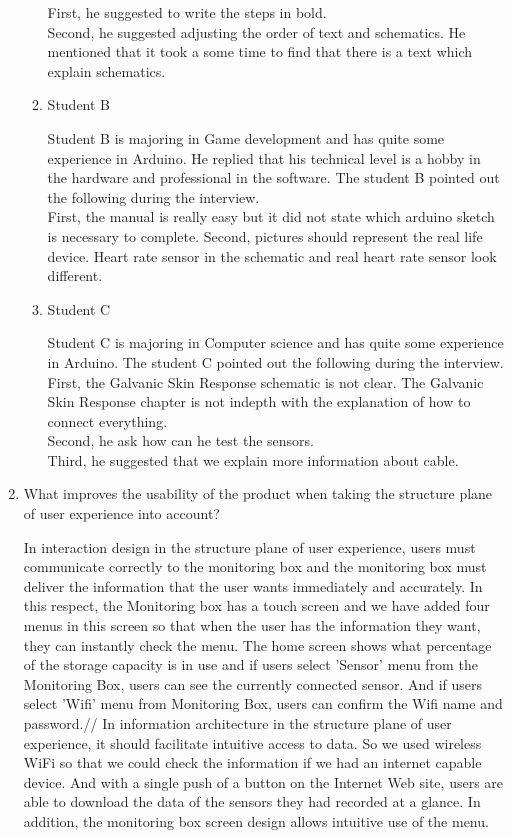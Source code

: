 \documentclass[conference]{IEEEtran}
\begin{document}
\begin{enumerate}
\begin{enumerate}
		First, he suggested to write the steps in bold.\\
		Second, he suggested adjusting the order of text and schematics. He mentioned that it took a some time to find that there is a text which explain schematics. 

\item Student B

Student B is majoring in Game development and has  quite some experience in Arduino. He replied that his technical level is a hobby in the hardware and professional in the software. The student B pointed out the following during the interview.\\

		First, the manual is really easy but it did not state which arduino sketch is necessary to complete.
		Second, pictures should represent the real life device. Heart rate sensor in the schematic and real heart rate sensor look different.

\item Student C

Student C is majoring in Computer science and has  quite some experience in Arduino. The student C pointed out the following during the interview.\\

		First, the Galvanic Skin Response schematic is not clear. The Galvanic Skin Response chapter is not indepth with the explanation of how to connect everything.\\
		Second, he ask how can he test the sensors.\\
		Third, he suggested that we explain more information about cable.\\

\end{enumerate}

 
\item What improves the usability of the product when taking the structure plane of user experience into account?

In interaction design in the structure plane of user experience, users must communicate correctly to the monitoring box and the monitoring box must deliver the information that the user wants immediately and accurately. In this respect, the Monitoring box has a touch screen and we have added four menus in this screen so that when the user has the information they want, they can instantly check the menu. The home screen shows what percentage of the storage capacity is in use and if users select 'Sensor' menu from the Monitoring Box, users can see the currently connected sensor. And if users select 'Wifi' menu from Monitoring Box, users can confirm the Wifi name and password.//
In information architecture in the structure plane of user experience, it should facilitate intuitive access to data. So we used wireless WiFi so that we could check the information if we had an internet capable device. And with a single push of a button on the Internet Web site, users are able to download the data of the sensors they had recorded at a glance. In addition, the monitoring box screen design allows intuitive use of the menu.
\\


\end{enumerate}
\end{document}
